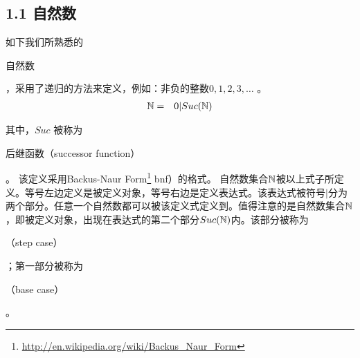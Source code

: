 \documentclass[twocolumn]{article}
\begin{document}
\begin{CJK}{UTF8}{gbsn}

\subsection*{1.1 自然数}
\label{naturals}

\indent \indent \indent 如下我们所熟悉的\begin{CJK}{UTF8}{gkai}自然数\end{CJK}，采用了递归的方法来定义，例如：非负的整数$0, 1, 2, 3, \ldots$ 。
\begin{eqnarray}
 \mathbb{N} & = & 0 |
Suc(\mathbb{N}) \label{nats}
\end{eqnarray}

\indent \indent 其中，$Suc$ 被称为\begin{CJK}{UTF8}{gkai}后继函数（successor function）\end{CJK}。 该定义采用Backus-Naur Form\footnote{\url{http://en.wikipedia.org/wiki/Backus_Naur_Form}} {\sc
  bnf}）的格式。 自然数集合$\mathbb{N}$被以上式子所定义。等号左边定义是被定义对象，等号右边是定义表达式。该表达式被符号$|$分为两个部分。任意一个自然数都可以被该定义式定义到。值得注意的是自然数集合$\mathbb{N}$，即被定义对象，出现在表达式的第二个部分$Suc(\mathbb{N})$内。该部分被称为\begin{CJK}{UTF8}{gkai}（step case）\end{CJK}；第一部分被称为\begin{CJK}{UTF8}{gkai}（base case）\end{CJK}。\\
  


\end{CJK}
\end{document}
